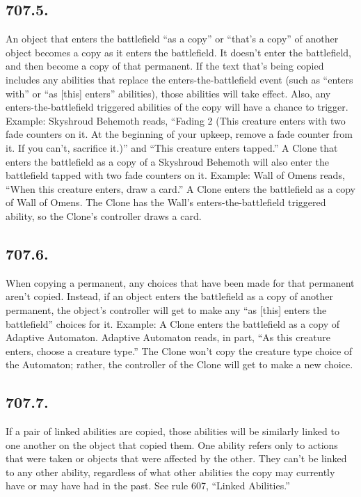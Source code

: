 \subsection*{707.5.}
An object that enters the battlefield “as a copy” or “that’s a copy” of another object becomes a copy as it enters the battlefield. It doesn’t enter the battlefield, and then become a copy of that permanent. If the text that’s being copied includes any abilities that replace the enters-the-battlefield event (such as “enters with” or “as [this] enters” abilities), those abilities will take effect. Also, any enters-the-battlefield triggered abilities of the copy will have a chance to trigger.
Example: Skyshroud Behemoth reads, “Fading 2 (This creature enters with two fade counters on it. At the beginning of your upkeep, remove a fade counter from it. If you can’t, sacrifice it.)” and “This creature enters tapped.” A Clone that enters the battlefield as a copy of a Skyshroud Behemoth will also enter the battlefield tapped with two fade counters on it.
Example: Wall of Omens reads, “When this creature enters, draw a card.” A Clone enters the battlefield as a copy of Wall of Omens. The Clone has the Wall’s enters-the-battlefield triggered ability, so the Clone’s controller draws a card.

\subsection*{707.6.}
When copying a permanent, any choices that have been made for that permanent aren’t copied. Instead, if an object enters the battlefield as a copy of another permanent, the object’s controller will get to make any “as [this] enters the battlefield” choices for it.
Example: A Clone enters the battlefield as a copy of Adaptive Automaton. Adaptive Automaton reads, in part, “As this creature enters, choose a creature type.” The Clone won’t copy the creature type choice of the Automaton; rather, the controller of the Clone will get to make a new choice.

\subsection*{707.7.}
If a pair of linked abilities are copied, those abilities will be similarly linked to one another on the object that copied them. One ability refers only to actions that were taken or objects that were affected by the other. They can’t be linked to any other ability, regardless of what other abilities the copy may currently have or may have had in the past. See rule 607, “Linked Abilities.”

